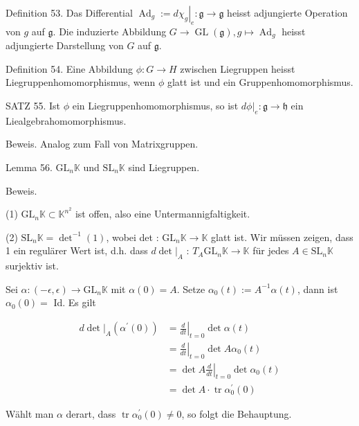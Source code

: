 \documentclass[10pt, letterpaper]{article}
\begin{document}
Definition 53. Das Differential $\operatorname{Ad}_{g}:=\left.d \chi_{g}\right|_{e}: \mathfrak{g} \rightarrow \mathfrak{g}$ heisst adjungierte Operation von $g$ auf $\mathfrak{g}$. Die induzierte Abbildung $G \rightarrow \operatorname{GL}(\mathfrak{g}), g \mapsto \operatorname{Ad}_{g}$ heisst adjungierte Darstellung von $G$ auf $\mathfrak{g}$.

Definition 54. Eine Abbildung $\phi: G \rightarrow H$ zwischen Liegruppen heisst Liegruppenhomomorphismus, wenn $\phi$ glatt ist und ein Gruppenhomomorphismus.

SATZ 55. Ist $\phi$ ein Liegruppenhomomorphismus, so ist $\left.d \phi\right|_{e}: \mathfrak{g} \rightarrow \mathfrak{h}$ ein Liealgebrahomomorphismus.

Beweis. Analog zum Fall von Matrixgruppen.


Lemma 56. $\mathrm{GL}_{n} \mathbb{K}$ und $\mathrm{SL}_{n} \mathbb{K}$ sind Liegruppen.

Beweis. 

(1) $\mathrm{GL}_{n} \mathbb{K} \subset \mathbb{K}^{n^{2}}$ ist offen, also eine Untermannigfaltigkeit.

(2) $\mathrm{SL}_{n} \mathbb{K}=\operatorname{det}^{-1}(1)$, wobei det : $\mathrm{GL}_{n} \mathbb{K} \rightarrow \mathbb{K}$ glatt ist. Wir müssen zeigen, dass 1 ein regulärer Wert ist, d.h. dass $\left.d \operatorname{det}\right|_{A}$ : $T_{A} \mathrm{GL}_{n} \mathbb{K} \rightarrow \mathbb{K}$ für jedes $A \in \mathrm{SL}_{n} \mathbb{K}$ surjektiv ist.

Sei $\alpha:(-\epsilon, \epsilon) \rightarrow \mathrm{GL}_{n} \mathbb{K}$ mit $\alpha(0)=A$. Setze $\alpha_{0}(t):= A^{-1} \alpha(t)$, dann ist $\alpha_{0}(0)=$ Id. Es gilt

$$
\begin{aligned}
\left.d \operatorname{det}\right|_{A}\left(\alpha^{\prime}(0)\right) & =\left.\frac{d}{d t}\right|_{t=0} \operatorname{det} \alpha(t) \\
& =\left.\frac{d}{d t}\right|_{t=0} \operatorname{det} A \alpha_{0}(t) \\
& =\left.\operatorname{det} A \frac{d}{d t}\right|_{t=0} \operatorname{det} \alpha_{0}(t) \\
& =\operatorname{det} A \cdot \operatorname{tr} \alpha_{0}^{\prime}(0)
\end{aligned}
$$

Wählt man $\alpha$ derart, dass $\operatorname{tr} \alpha_{0}^{\prime}(0) \neq 0$, so folgt die Behauptung.
\end{document}

